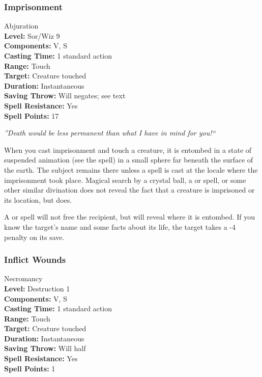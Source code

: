 \subsubsection{Imprisonment}
\label{Spell:Imprisonment}
Abjuration
\\ \textbf{Level:} Sor/Wiz 9 
\\ \textbf{Components:} V, S 
\\ \textbf{Casting Time:} 1 standard action 
\\ \textbf{Range:} Touch 
\\ \textbf{Target:} Creature touched 
\\ \textbf{Duration:} Instantaneous 
\\ \textbf{Saving Throw:} Will negates; see text 
\\ \textbf{Spell Resistance:} Yes
\\ \textbf{Spell Points:} 17

\emph{''Death would be less permanent than what I have in mind for you!``}

When you cast imprisonment and touch a creature, it is entombed in a state of suspended animation 
(see the  spell) in a small sphere far beneath the surface of the earth. 
The subject remains there unless a  spell is cast at the locale where the imprisonment took place. 
Magical search by a crystal ball, a  or  spell, 
or some other similar divination does not reveal the fact that a creature is imprisoned or its location, 
but  does.

A  or  spell will not free the recipient, but will reveal where it is entombed. 
If you know the target's name and some facts about its life, the target takes a -4 penalty on its save.
\subsubsection{Inflict Wounds}
\label{Spell:InflictWounds}
Necromancy
\\ \textbf{Level:} Destruction 1
\\ \textbf{Components:} V, S
\\ \textbf{Casting Time:} 1 standard action
\\ \textbf{Range:} Touch
\\ \textbf{Target:} Creature touched
\\ \textbf{Duration:} Instantaneous
\\ \textbf{Saving Throw:} Will half
\\ \textbf{Spell Resistance:} Yes
\\ \textbf{Spell Points:} 1

